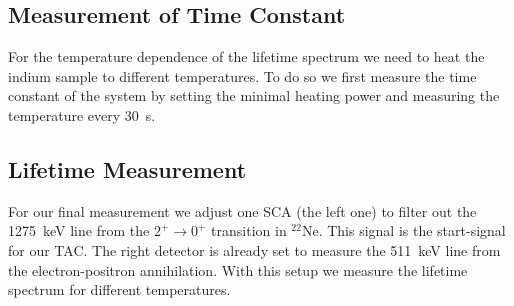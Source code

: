 \subsection{Measurement of Time Constant}
For the temperature dependence of the lifetime spectrum we need to heat the indium sample to different temperatures. To do so we first measure the time constant of the system by setting the minimal heating power and measuring the temperature every \SI{30}{\second}.

\subsection{Lifetime Measurement}
For our final measurement we adjust one SCA (the left one) to filter out the \SI{1275}{\kilo\electronvolt} line from the $2^+ \rightarrow 0^+$ transition in $^{22}$Ne. This signal is the start-signal for our TAC. The right detector is already set to measure the \SI{511}{\kilo\electronvolt} line from the electron-positron annihilation. With this setup we measure the lifetime spectrum for different temperatures.
